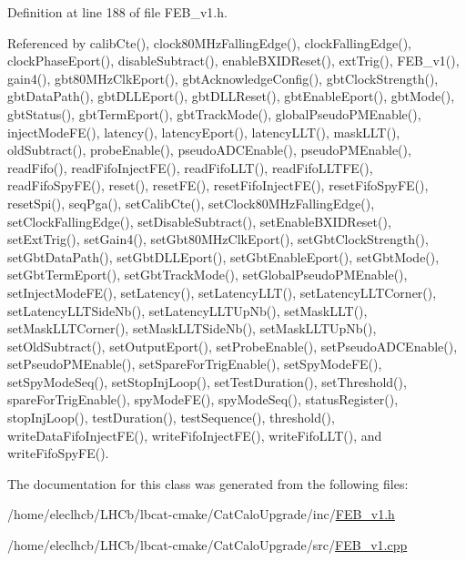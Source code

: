 Definition at line 188 of file FEB\_\-v1.h.

Referenced by calibCte(), clock80MHzFallingEdge(), clockFallingEdge(), clockPhaseEport(), disableSubtract(), enableBXIDReset(), extTrig(), FEB\_\-v1(), gain4(), gbt80MHzClkEport(), gbtAcknowledgeConfig(), gbtClockStrength(), gbtDataPath(), gbtDLLEport(), gbtDLLReset(), gbtEnableEport(), gbtMode(), gbtStatus(), gbtTermEport(), gbtTrackMode(), globalPseudoPMEnable(), injectModeFE(), latency(), latencyEport(), latencyLLT(), maskLLT(), oldSubtract(), probeEnable(), pseudoADCEnable(), pseudoPMEnable(), readFifo(), readFifoInjectFE(), readFifoLLT(), readFifoLLTFE(), readFifoSpyFE(), reset(), resetFE(), resetFifoInjectFE(), resetFifoSpyFE(), resetSpi(), seqPga(), setCalibCte(), setClock80MHzFallingEdge(), setClockFallingEdge(), setDisableSubtract(), setEnableBXIDReset(), setExtTrig(), setGain4(), setGbt80MHzClkEport(), setGbtClockStrength(), setGbtDataPath(), setGbtDLLEport(), setGbtEnableEport(), setGbtMode(), setGbtTermEport(), setGbtTrackMode(), setGlobalPseudoPMEnable(), setInjectModeFE(), setLatency(), setLatencyLLT(), setLatencyLLTCorner(), setLatencyLLTSideNb(), setLatencyLLTUpNb(), setMaskLLT(), setMaskLLTCorner(), setMaskLLTSideNb(), setMaskLLTUpNb(), setOldSubtract(), setOutputEport(), setProbeEnable(), setPseudoADCEnable(), setPseudoPMEnable(), setSpareForTrigEnable(), setSpyModeFE(), setSpyModeSeq(), setStopInjLoop(), setTestDuration(), setThreshold(), spareForTrigEnable(), spyModeFE(), spyModeSeq(), statusRegister(), stopInjLoop(), testDuration(), testSequence(), threshold(), writeDataFifoInjectFE(), writeFifoInjectFE(), writeFifoLLT(), and writeFifoSpyFE().

The documentation for this class was generated from the following files:\begin{DoxyCompactItemize}
\item 
/home/eleclhcb/LHCb/lbcat-\/cmake/CatCaloUpgrade/inc/\hyperlink{FEB__v1_8h}{FEB\_\-v1.h}\item 
/home/eleclhcb/LHCb/lbcat-\/cmake/CatCaloUpgrade/src/\hyperlink{FEB__v1_8cpp}{FEB\_\-v1.cpp}\end{DoxyCompactItemize}
